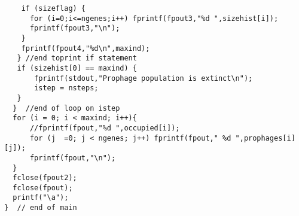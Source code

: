 \begin{lstlisting}
    if (sizeflag) {
      for (i=0;i<=ngenes;i++) fprintf(fpout3,"%d ",sizehist[i]);
      fprintf(fpout3,"\n");
    }
    fprintf(fpout4,"%d\n",maxind);
   } //end toprint if statement
   if (sizehist[0] == maxind) {
       fprintf(stdout,"Prophage population is extinct\n");
       istep = nsteps;
   }    
  }  //end of loop on istep
  for (i = 0; i < maxind; i++){
      //fprintf(fpout,"%d ",occupied[i]);
      for (j  =0; j < ngenes; j++) fprintf(fpout," %d ",prophages[i][j]);
      fprintf(fpout,"\n");
  }   
  fclose(fpout2);
  fclose(fpout);
  printf("\a");
}  // end of main

\end{lstlisting}

